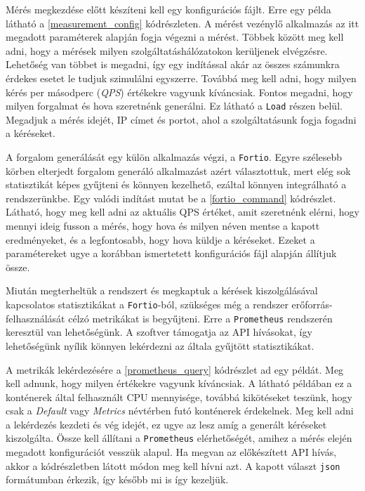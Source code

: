 Mérés megkezdése előtt készíteni kell egy konfigurációs fájlt. Erre egy példa látható a \ref{measurement_config} kódrészleten. A mérést vezénylő alkalmazás az itt megadott paraméterek alapján fogja végezni a mérést. Többek között meg kell adni, hogy a mérések milyen szolgáltatáshálózatokon kerüljenek elvégzésre. Lehetőség van többet is megadni, így egy indítással akár az összes számunkra érdekes esetet le tudjuk szimulálni egyszerre. Továbbá meg kell adni, hogy milyen kérés per másodperc (\textit{QPS}) értékekre vagyunk kíváncsiak. Fontos megadni, hogy milyen forgalmat és hova szeretnénk generálni. Ez látható a \verb+Load+ részen belül. Megadjuk a mérés idejét, IP címet és portot, ahol a szolgáltatásunk fogja fogadni a kéréseket.\\


\lstset{caption=Mérés konfigurációja, label=measurement_config}


A forgalom generálását egy külön alkalmazás végzi, a \verb+Fortio+. Egyre szélesebb körben elterjedt forgalom generáló alkalmazást azért választottuk, mert elég sok statisztikát képes gyűjteni és könnyen kezelhető, ezáltal könnyen integrálható a rendszerünkbe. Egy valódi indítást mutat be a  \ref{fortio_command} kódrészlet. 
Látható, hogy meg kell adni az aktuális QPS értéket, amit szeretnénk elérni, hogy mennyi ideig fusson a mérés, hogy hova és milyen néven mentse a kapott eredményeket, és a legfontosabb, hogy hova küldje a kéréseket.
Ezeket a paramétereket ugye a korábban ismertetett konfigurációs fájl alapján állítjuk össze. \\



Miután megterheltük a rendszert és megkaptuk a kérések kiszolgálásával kapcsolatos statisztikákat a \verb+Fortio+-ból, szükséges még a rendszer erőforrás-felhasználását célzó metrikákat is begyűjteni. 
Erre a \verb+Prometheus+ rendszerén keresztül van lehetőségünk.
A szoftver támogatja az API hívásokat, így lehetőségünk nyílik könnyen lekérdezni az általa gyűjtött statisztikákat. 

A metrikák lekérdezésére a \ref{prometheus_query} kódrészlet ad egy példát. Meg kell adnunk, hogy milyen értékekre vagyunk kíváncsiak. A látható példában ez a konténerek által felhasznált CPU mennyisége, továbbá kikötéseket teszünk, hogy csak a \textit{Default} vagy \textit{Metrics} névtérben futó konténerek érdekelnek.
Meg kell adni a lekérdezés kezdeti és vég idejét, ez ugye az lesz amíg a generált kéréseket kiszolgálta.
Össze kell állítani a \verb+Prometheus+ elérhetőségét, amihez a mérés elején megadott konfigurációt vesszük alapul. Ha megvan az előkészített API hívás, akkor a kódrészletben látott módon meg kell hívni azt. A kapott választ \verb+json+ formátumban érkezik, így később mi is így kezeljük. \\



